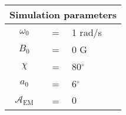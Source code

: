 \begin{tabular}{ccl}
\multicolumn{3}{c}{Simulation parameters} \\
\hline
$\omega_0$  &=& 1 rad/s\\
$B_0$  &=& $0$ G \\
$\chi$  &=& 80$^{\circ}$ \\
$a_0$ &=& 6$^{\circ}$ \\
$\mathcal{A}_{\mathrm{EM}}$ &= & $0$
\end{tabular}
